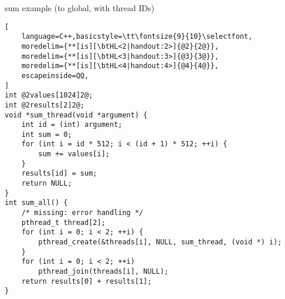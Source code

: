 
\begin{frame}[fragile,label=sumToGlobalWithId]{sum example (to global, with thread IDs)}
\begin{lstlisting}[
    language=C++,basicstyle=\tt\fontsize{9}{10}\selectfont,
    moredelim={**[is][\btHL<2|handout:2>]{@2}{2@}},
    moredelim={**[is][\btHL<3|handout:3>]{@3}{3@}},
    moredelim={**[is][\btHL<4|handout:4>]{@4}{4@}},
    escapeinside=QQ,
]
int @2values[1024]2@;
int @2results[2]2@;
void *sum_thread(void *argument) {
    int id = (int) argument;
    int sum = 0;
    for (int i = id * 512; i < (id + 1) * 512; ++i) {
        sum += values[i];
    }
    results[id] = sum;
    return NULL;
}
int sum_all() {
    /* missing: error handling */
    pthread_t thread[2];
    for (int i = 0; i < 2; ++i) {
        pthread_create(&threads[i], NULL, sum_thread, (void *) i);
    }
    for (int i = 0; i < 2; ++i)
        pthread_join(threads[i], NULL);
    return results[0] + results[1];
}
\end{lstlisting}
\end{frame}
